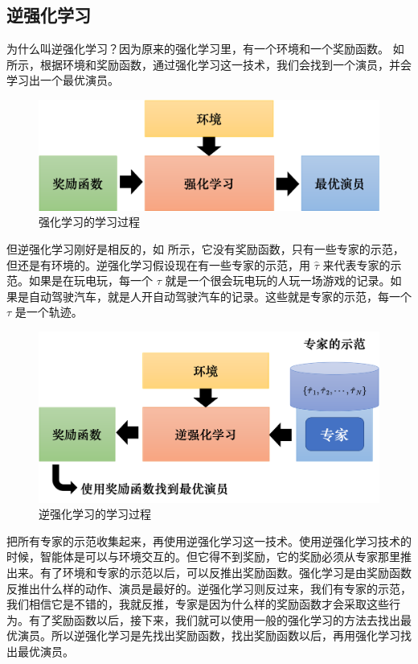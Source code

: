 
\subsection{逆强化学习}  

为什么叫逆强化学习？因为原来的强化学习里，有一个环境和一个奖励函数。
如 所示，根据环境和奖励函数，通过强化学习这一技术，我们会找到一个演员，并会学习出一个最优演员。

\begin{figure}[htb]
   \centering
   \includegraphics[width=0.5\linewidth]{res/ch11/11.7a}
   \caption{强化学习的学习过程}
   \label{fig:11.7a}
\end{figure}

但逆强化学习刚好是相反的，如 所示，它没有奖励函数，只有一些专家的示范，但还是有环境的。逆强化学习假设现在有一些专家的示范，用 $\hat{\tau}$ 来代表专家的示范。如果是在玩电玩，每一个 $\tau$ 就是一个很会玩电玩的人玩一场游戏的记录。如果是自动驾驶汽车，就是人开自动驾驶汽车的记录。这些就是专家的示范，每一个 $\tau$ 是一个轨迹。

\begin{figure}[htb]
   \centering
   \includegraphics[width=0.5\linewidth]{res/ch11/11.7b}
   \caption{逆强化学习的学习过程}
   \label{fig:11.7b}
\end{figure}

把所有专家的示范收集起来，再使用逆强化学习这一技术。使用逆强化学习技术的时候，智能体是可以与环境交互的。但它得不到奖励，它的奖励必须从专家那里推出来。有了环境和专家的示范以后，可以反推出奖励函数。强化学习是由奖励函数反推出什么样的动作、演员是最好的。逆强化学习则反过来，我们有专家的示范，我们相信它是不错的，我就反推，专家是因为什么样的奖励函数才会采取这些行为。有了奖励函数以后，接下来，我们就可以使用一般的强化学习的方法去找出最优演员。所以逆强化学习是先找出奖励函数，找出奖励函数以后，再用强化学习找出最优演员。

